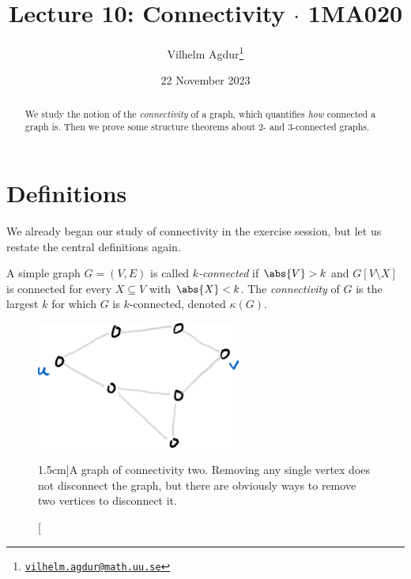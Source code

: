 \documentclass[nobib]{tufte-handout}
\title{Lecture 10: Connectivity $\cdot$ 1MA020}
\author[Vilhelm Agdur]{Vilhelm Agdur\thanks{\href{mailto:vilhelm.agdur@math.uu.se}{\nolinkurl{vilhelm.agdur@math.uu.se}}}}
\date{22 November 2023}
\begin{document}
\maketitle%

\begin{abstract}
\noindent
We study the notion of the \emph{connectivity} of a graph, which quantifies \emph{how} connected a graph is. Then we prove some structure theorems about $2$- and $3$-connected graphs.
\end{abstract}

\section{Definitions}

We already began our study of connectivity in the exercise session, but let us restate the central definitions again.

\begin{definition}
  A simple graph $G = (V,E)$ is called \emph{$k$-connected} if $\abs{V} > k$ and $G[V\setminus X]$ is connected for every $X \subseteq V$ with $\abs{X} < k$. The \emph{connectivity} of $G$ is the largest $k$ for which $G$ is $k$-connected, denoted $\kappa(G)$. 
\end{definition}

\begin{figure}
  \centering
  \includegraphics[width=0.6\textwidth]{graphics/L10_connectivity/twoconnected_graph.png}
  \caption[][1.5cm]{A graph of connectivity two. Removing any single vertex does not disconnect the graph, but there are obviously ways to remove two vertices to disconnect it.}
  \label{fig:twoconnected_graph}
\end{figure}
\end{document}
